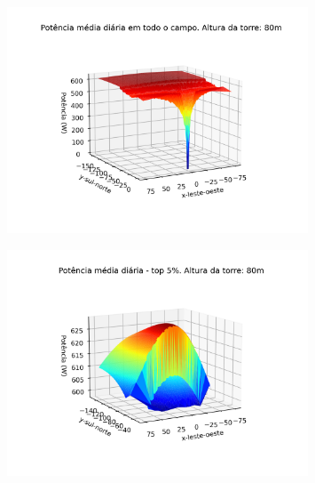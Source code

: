 \documentclass[12pt,notheorems,hyperref={pdfauthor= Rafael Nardi}]{beamer}
\begin{document}
\begin{frame}%
	\begin{figure}[htpb]
		\centering
		\includegraphics[width=0.8\textwidth]{../../plots/tower_shadow_correction/square_grid_along_day_80mfull_grid.png}
		\label{fig:heliost_field_average_80m}
	\end{figure}
\end{frame}

\begin{frame}%
	\begin{figure}[htpb]
		\centering
		\includegraphics[width=0.8\textwidth]{../../plots/tower_shadow_correction/square_grid_along_day_80mtop_5_most_powerfull.png}
		\label{fig:heliost_field_average_80m}
	\end{figure}
\end{frame}
\end{document}
